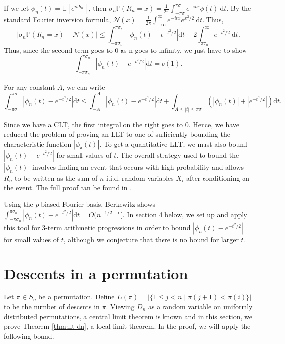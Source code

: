 \documentclass[12pt]{article} %
\newcommand{\abs}[1]{\left\lvert#1\right\rvert}
\renewcommand{\P}{\mathbb{P}}
\newcommand{\E}{\mathbb{E}}
\renewcommand{\d}{\mathrm{d}}
\theoremstyle{definition}
\theoremstyle{definition}
\begin{document}
If we let $\phi_n(t) = \E[e^{itR_n}]$, then 
$\sigma_n \P(R_n = x) = \frac{1}{2\pi} \int_{-\pi\sigma}^{\pi\sigma} e^{-itx}\phi(t)\ \d t.$
By the standard Fourier inversion formula,
$\mathcal{N}(x) = \frac{1}{2\pi} \int_{-\infty}^{\infty} e^{-itx}e^{x^2/2}\ \d t.$ Thus, 
\[ \abs{\sigma_n \P(R_n = x)- \mathcal{N}(x)} \leq \int_{-\pi\sigma_n}^{\pi\sigma_n} \abs{\phi_n(t) - e^{-t^2/2}} \d t + 2 \int_{\pi\sigma_n}^{\infty} e^{-t^2/2}\ \d t.
\]
Thus, since the second term goes to 0 as n goes to infinity, we just have to show \[\int_{-\pi\sigma_n}^{\pi\sigma_n} \abs{\phi_n(t) - e^{-t^2/2}} \d t = o(1).\]

For any constant $A$, we can write
	\[
		\int_{-\pi \sigma}^{\pi \sigma} \abs{\phi_n(t) - e^{-t^2/2}} \d t
		\leq \int_{-A}^{A} \abs{\phi_n(t) - e^{-t^2/2}} \d t
		+ \int_{A \leq \abs{t} \leq \pi \sigma} (\abs{\phi_n(t)} + |e^{-t^2/2}|) \d t.
\]

Since we have a CLT, the first integral on the right goes to 0. Hence, we have reduced the problem of proving an LLT to one of sufficiently bounding the characteristic function $\abs{\phi_n(t)}$. To get a quantitative LLT, we must also bound $\abs{\phi_n(t) - e^{-t^2/2}}$ for small values of $t$.
The overall strategy used to bound the $\abs{\phi_n(t)}$ involves finding an event that occurs with high probability and allows $R_n$ to be written as the sum of $n$ i.i.d. random variables $X_i$ after conditioning on the event. The full proof can be found in \cite{GilmerKopparty14}.

Using the $p$-biased Fourier basis, Berkowitz \cite{Berkowitz17} shows $\int_{-\pi\sigma_n}^{\pi\sigma_n} \abs{\phi_n(t) - e^{-t^2/2}} \d t = O(n^{-1/2+\epsilon}$). In section 4 below, we set up and apply this tool for 3-term arithmetic progressions in order to bound $\abs{\phi_n(t) - e^{-t^2/2}}$ for small values of $t$, although we conjecture that there is no bound for larger $t$. 


\section{Descents in a permutation}

Let $\pi \in S_n$ be a permutation. Define $D(\pi) = \abs{\{1 \leq j < n \mid \pi(j + 1) < \pi(i)\}}$ to be the number of descents in $\pi$. Viewing $D_n$ as a random variable on uniformly distributed permutations, a central limit theorem is known \cite{Fulman97} and in this section, we prove Theorem \ref{thm:llt-dn}, a local limit theorem. In the proof, we will apply the following bound.
\end{document}
